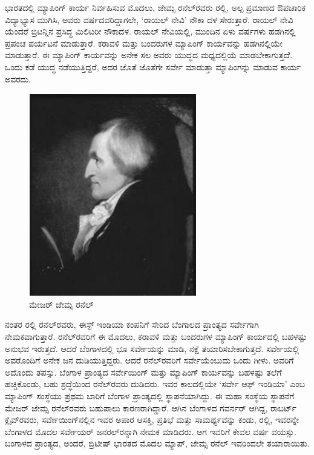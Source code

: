 ಭಾರತದಲ್ಲಿ ಮ್ಯಾಪಿಂಗ್​ ಕಾರ್ಯ ನಿರ್ವಹಿಸುವ ಮೊದಲು, ಜೇಮ್ಸ ರನೆಲ್​ರವರು  ರಲ್ಲಿ, ಅಲ್ಪ ಪ್ರಮಾಣದ ಔಪಚಾರಿಕ ವಿದ್ಯಾಭ್ಯಾಸ ಮುಗಿಸಿ, ಅವರು  ವರ್ಷದವರಿದ್ದಾಗಲೇ, ‘ರಾಯಲ್​ ನೇವಿ’ ನೌಕಾ ದಳ ಸೇರುತ್ತಾರೆ. ರಾಯಲ್​ ನೇವಿ ಯೆಂದರೆ ಬ್ರಿಟನ್ನಿನ ಪ್ರಸಿದ್ಧ ಮಿಲಿಟರೀ ನೌಕಾದಳ. ರಾಯಲ್​ ನೇವಿಯಲ್ಲಿ, ಮುಂದಿನ ಏಳು ವರ್ಷಗಳು ಹಡಗಿನಲ್ಲಿ ಪ್ರಪಂಚ ಪರ್ಯಟನೆ ಮಾಡುತ್ತಾರೆ. ಕರಾವಳಿ ಮತ್ತು ಬಂದರುಗಳ ಮ್ಯಾಪಿಂಗ್​ ಕಾರ್ಯವನ್ನು ಹಡಗಿನಲ್ಲಿಯೇ ಮಾಡುತ್ತಾರೆ. ಈ ಮ್ಯಾಪಿಂಗ್​ ಕಾರ್ಯವನ್ನು ಅನೇಕ ಸಲ ಅವರು ಯುದ್ಧದ ಮಧ್ಯದಲ್ಲಿಯೆ ಮಾಡಬೇಕಾಗುತ್ತದೆೆ. ಒಂದು ಕಡೆ ಯುದ್ಧ ನಡೆಯುತ್ತಿದ್ದರೆ, ಅದರ ಜೊತೆ ಜೊತೆಗೇ ಸರ್ವೇ ಮಾಡುತ್ತಾ ಮ್ಯಾಪಿಂಗನ್ನು ಮಾಡುವ ಕಾರ್ಯ ಅವರದು.

\begin{figure}[!htbp]
\includegraphics[scale=1.1]{"images/image017.jpg"}
\caption{ಮೇಜರ್​ ಜೇಮ್ಸ ರನೆಲ್​}\label{art13-fig1}
\end{figure}

ನಂತರ  ರಲ್ಲಿ ರನೆಲ್​ರವರು, ಈಸ್ಟ್​ ಇಂಡಿಯಾ ಕಂಪನಿಗೆ ಸೇರಿದ ಬೆಂಗಾಲದ ಪ್ರಾಂತ್ಯದ ಸರ್ವೇಗಾಗಿ ನೇಮಕವಾಗುತ್ತಾರೆ. ರನೆಲ್​ರವರಿಗೆ ಈ ಮೊದಲು, ಕರಾವಳಿ ಮತ್ತು ಬಂದರುಗಳ ಮ್ಯಾಪಿಂಗ್​ ಕಾರ್ಯದಲ್ಲಿ ಬಹಳಷ್ಟು ಅನುಭವ ಇರುತ್ತದೆ. ಆದರೆ ಬೆಂಗಾಳದಲ್ಲಿ ಭೂ ಸರ್ವೇಯನ್ನು ಮಾಡಿ, ನಕ್ಷೆ ತಯಾರಿಸಬೇಕಾಗುತ್ತದೆ. ಸರ್ವೇಯಲ್ಲಿ ಅವರೊಂದಿಗೆ ಅನೇಕ ಜನ ದುಡಿಯುತ್ತಿದ್ದರು. ಆದರೆ ರನೆಲ್​ರವರಿಗೆ ಸರ್ವೇಯೆಂಬುದು ಒಂದು ಗೀಳು. ಅವರಿಗೆ ಅದೊಂದು ತಪಸ್ಸು. ಬೆಂಗಾಳ ಪ್ರಾಂತ್ಯದ ಸರ್ವೇಯಿಂಗ್​ ಮತ್ತು ಮ್ಯಾಪಿಂಗ್​ ಕಾರ್ಯವನ್ನು ಬಹಳಷ್ಟು ತಲೆಗೆ ಹಚ್ಚಿಕೊಂಡು, ಬಹು ಶ್ರದ್ಧೆಯಿಂದ ರನೆಲ್​ರವರು ದುಡಿದರು. ಇವರ ಕಾಲದಲ್ಲಿಯೇ ‘ಸರ್ವೇ ಆಫ್​ ಇಂಡಿಯಾ’ ಎಂಬ ಮ್ಯಾಪಿಂಗ್​ ಸಂಸ್ಥೆಯು ಪ್ರಥಮ ಬಾರಿಗೆ ಬೆಂಗಾಳ ಪ್ರಾಂತ್ಯದಲ್ಲಿ ಸ್ಥಾಪನೆಯಾಗಿದ್ದು. ಈ ಮಹಾ ಸಂಸ್ಥೆಯ ಸ್ಥಾಪನೆಗೆ ಮೇಜರ್​ ಜೇಮ್ಸ ರನೆಲ್​ರವರು ಬಹುಪಾಲು ಕಾರಣರಾಗಿದ್ದಾರೆ. ಆಗಿನ ಬೆಂಗಾಳದ ಗವರ್ನರ್​ ಆಗಿದ್ದ, ರಾಬರ್ಟ್ ಕ್ಲೈವ್​ರವರು, ಸರ್ವೇಯಿಂಗ್​ನಲ್ಲಿನ ಇವರ ಅಪಾರ ಆಸಕ್ತಿ, ಪ್ರತಿಭೆ ಮತ್ತು ಸಾಮರ್ಥ್ಯವನ್ನು ಕಂಡು,  ರಲ್ಲಿ, ಇವರನ್ನೇ ಬೆಂಗಾಳದ ಮೊದಲ ಸರ್ವೇಯರ್​ ಜನರಲ್​ರನ್ನಾಗಿ ನೇಮಕ ಮಾಡಿದರು. ಆಗ ಇವರಿಗೆ ಕೇವಲ  ವರ್ಷ ವಯಸ್ಸು. ಬಂಗಾಳದ ಪ್ರಾಂತ್ಯದ, ಅಂದರೆ, ಬ್ರಿಟೀಷ್​ ಭಾರತದ ಮೊದಲ ಮ್ಯಾಪ್​, ಜೇಮ್ಸ ರನೆಲ್​ ಇವರಿಂದಲೇ ತಯಾರಾಯಿತು.

